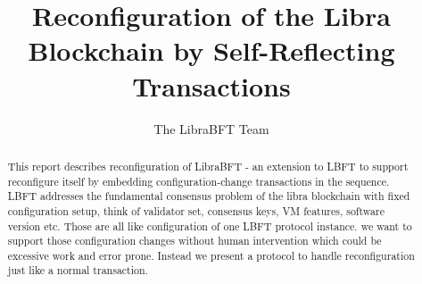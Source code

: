 \documentclass[letterpaper,10pt]{article}
\newcommand{\LBFT}{LBFT\xspace}
\begin{document}
\title{Reconfiguration of the Libra Blockchain by Self-Reflecting Transactions}
\author{The LibraBFT Team}
\date{}
\maketitle


\newcommand{\myomit}[1]{}

\begin{abstract}
This report describes reconfiguration of LibraBFT - an extension to \LBFT to support reconfigure itself
 by embedding configuration-change transactions in the sequence.
\LBFT addresses the fundamental consensus problem of the libra blockchain with fixed configuration setup,
think of validator set, consensus keys, VM features, software version etc.
Those are all like configuration of one \LBFT protocol instance. we want to support those configuration changes
without human intervention which could be excessive work and error prone. Instead we present
a protocol to handle reconfiguration just like a normal transaction.
\end{abstract}






\begingroup


\endgroup
\end{document}
